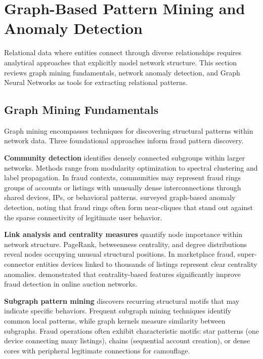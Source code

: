 \section{Graph-Based Pattern Mining and Anomaly Detection}
\label{sec:2_2}

Relational data where entities connect through diverse relationships requires analytical approaches that explicitly model network structure. This section reviews graph mining fundamentals, network anomaly detection, and Graph Neural Networks as tools for extracting relational patterns.

\subsection{Graph Mining Fundamentals}

Graph mining encompasses techniques for discovering structural patterns within network data. Three foundational approaches inform fraud pattern discovery.

\textbf{Community detection} identifies densely connected subgroups within larger networks. Methods range from modularity optimization \cite{newman2006modularity} to spectral clustering and label propagation. In fraud contexts, communities may represent fraud rings groups of accounts or listings with unusually dense interconnections through shared devices, IPs, or behavioral patterns. \citeauthor{akoglu2015graph} \cite{akoglu2015graph} surveyed graph-based anomaly detection, noting that fraud rings often form near-cliques that stand out against the sparse connectivity of legitimate user behavior.

\textbf{Link analysis and centrality measures} quantify node importance within network structure. PageRank, betweenness centrality, and degree distributions reveal nodes occupying unusual structural positions. In marketplace fraud, super-connector entities devices linked to thousands of listings represent clear centrality anomalies. \citeauthor{savage2014anomaly} \cite{savage2014anomaly} demonstrated that centrality-based features significantly improve fraud detection in online auction networks.

\textbf{Subgraph pattern mining} discovers recurring structural motifs that may indicate specific behaviors. Frequent subgraph mining techniques \cite{jiang2013survey} identify common local patterns, while graph kernels measure similarity between subgraphs. Fraud operations often exhibit characteristic motifs: star patterns (one device connecting many listings), chains (sequential account creation), or dense cores with peripheral legitimate connections for camouflage.

